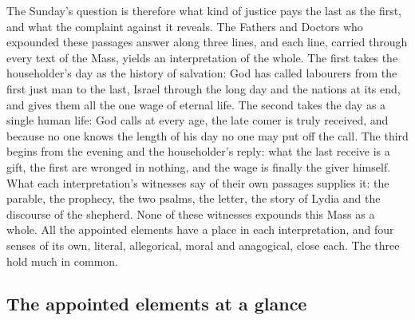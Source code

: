 The Sunday's question is therefore what kind of justice pays the last as the
first, and what the complaint against it reveals. The Fathers and Doctors who
expounded these passages answer along three lines, and each line, carried
through every text of the Mass, yields an interpretation of the whole. The first takes
the householder's day as the history of salvation: God has called labourers
from the first just man to the last, Israel through the long day and the
nations at its end, and gives them all the one wage of eternal life. The
second takes the day as a single human life: God calls at every age, the
late comer is truly received, and because no one knows the length of his day
no one may put off the call. The third begins from the evening and the
householder's reply: what the last receive is a gift, the first are wronged
in nothing, and the wage is finally the giver himself. What each
interpretation's witnesses say of their own passages supplies it: the
parable, the prophecy, the two psalms, the letter, the story of Lydia and the
discourse of the shepherd. None of these witnesses expounds this Mass as a
whole. All the appointed elements have a place in each interpretation, and
four senses of its own, literal, allegorical, moral and anagogical, close
each. The three hold much in common.

\subsection{The appointed elements at a glance}

